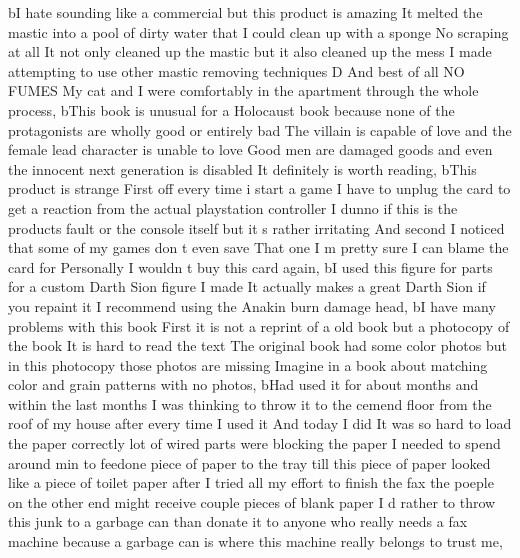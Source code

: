 \documentclass[
]{article}
\newenvironment{Shaded}{}{}
\newcommand{\NormalTok}[1]{#1}
\newcommand{\StringTok}[1]{\textcolor[rgb]{0.25,0.44,0.63}{#1}}
\begin{document}
\begin{Shaded}
\begin{Highlighting}[]
\NormalTok{       b}\StringTok{\textquotesingle{}I hate sounding like a commercial but this product is amazing It melted the mastic into a pool of dirty water that I could clean up with a sponge No scraping at all It not only cleaned up the mastic but it also cleaned up the mess I made attempting to use other mastic removing techniques D And best of all NO FUMES My cat and I were comfortably in the apartment through the whole process\textquotesingle{}}\NormalTok{,}
\NormalTok{       b}\StringTok{\textquotesingle{}This book is unusual for a Holocaust book because none of the protagonists are wholly good or entirely bad The villain is capable of love and the female lead character is unable to love Good men are damaged goods and even the innocent next generation is disabled It definitely is worth reading\textquotesingle{}}\NormalTok{,}
\NormalTok{       b}\StringTok{\textquotesingle{}This product is strange First off every time i start a game I have to unplug the card to get a reaction from the actual playstation controller I dunno if this is the products fault or the console itself but it s rather irritating And second I noticed that some of my games don t even save That one I m pretty sure I can blame the card for Personally I wouldn t buy this card again\textquotesingle{}}\NormalTok{,}
\NormalTok{       b}\StringTok{\textquotesingle{}I used this figure for parts for a custom Darth Sion figure I made It actually makes a great Darth Sion if you repaint it I recommend using the Anakin burn damage head\textquotesingle{}}\NormalTok{,}
\NormalTok{       b}\StringTok{\textquotesingle{}I have many problems with this book First it is not a reprint of a old book but a photocopy of the book It is hard to read the text The original book had some color photos but in this photocopy those photos are missing Imagine in a book about matching color and grain patterns with no photos\textquotesingle{}}\NormalTok{,}
\NormalTok{       b}\StringTok{\textquotesingle{}Had used it for about months and within the last months I was thinking to throw it to the cemend floor from the roof of my house after every time I used it And today I did It was so hard to load the paper correctly lot of wired parts were blocking the paper I needed to spend around min to feedone piece of paper to the tray till this piece of paper looked like a piece of toilet paper after I tried all my effort to finish the fax the poeple on the other end might receive couple pieces of blank paper I d rather to throw this junk to a garbage can than donate it to anyone who really needs a fax machine because a garbage can is where this machine really belongs to trust me\textquotesingle{}}\NormalTok{,}

\end{Highlighting}
\end{Shaded}
\end{document}

